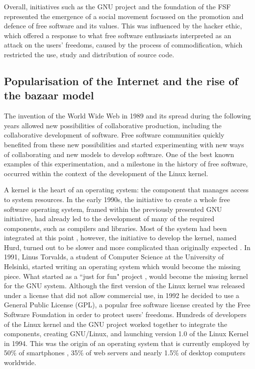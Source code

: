 Overall, initiatives such as the GNU project and the foundation of the FSF represented the emergence of a social movement focussed on the promotion and defence of free software and its values. This was influenced by the hacker ethic, which offered a response to what free software enthusiasts interpreted as an attack on the users' freedoms, caused by the process of commodification, which restricted the use, study and distribution of source code. 

\subsection{Popularisation of the Internet and the rise of the bazaar model}
\label{subsec:bazaar}
The invention of the World Wide Web in 1989 \parencite{berners1992world} and its spread during the following years allowed new possibilities of collaborative production, including the collaborative development of software. Free software communities quickly benefited from these new possibilities and started experimenting with new ways of collaborating and new models to develop software. One of the best known examples of this experimentation, and a milestone in the history of free software, occurred within the context of the development of the Linux kernel. 

A kernel is the heart of an operating system: the component that manages access to system resources. In the early 1990s, the initiative to create a whole free software operating system, framed within the previously presented GNU initiative, had already led to the development of many of the required components, such as compilers and libraries. Most of the system had been integrated at this point \parencite{linux-gnu-fs:2014:Online}, however,  the initiative to develop the kernel, named Hurd, turned out to be slower and more complicated than originally expected \parencite{gnu-hurd:2014:Online}. In 1991, Linus Torvalds, a student of Computer Science at the University of Helsinki, started writing an operating system which would become the missing piece. What started as a ``just for fun" project \parencite{torvalds2001just}, would become the missing kernel for the GNU system. Although the first version of the Linux kernel was released under a license that did not allow commercial use, in 1992 he decided to use a General Public License (GPL), a popular free software license created by the Free Software Foundation in order to protect users' freedoms. Hundreds of developers of the Linux kernel and the GNU project worked together to integrate the components, creating GNU\slash Linux, and launching version 1.0 of the Linux Kernel in 1994. This was the origin of an operating system that is currently employed by 50\% of smartphones \parencite{linux-smartphones-stats:2013:Online}, 35\% of web servers \parencite{linux-website-stats:2014:Online} and nearly 1.5\% of desktop computers \parencite{linux-desktop-stats:2014:Online} worldwide.

